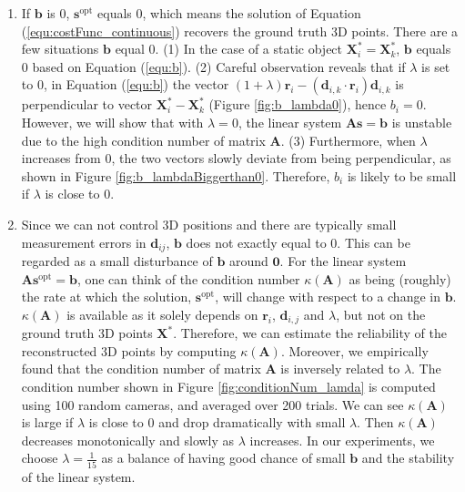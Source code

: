 \begin{enumerate}
\item If $\mathbf{b}$ is 0, $\mathbf{s}^\text{opt}$ equals 0, which means the solution of Equation (\ref{equ:costFunc_continuous}) recovers the ground truth 3D points. There are a few situations  $\mathbf{b}$ equal 0. (1) In the case of a static object $\mathbf{X}_i^* = \mathbf{X}_k^*$, $\mathbf{b}$ equals 0 based on Equation (\ref{equ:b}). (2) Careful observation reveals that if $\lambda$ is set to $0$, in Equation (\ref{equ:b}) the vector $(1+\lambda)\mathbf{r}_i - (\mathbf{d}_{i,k}\cdot \mathbf{r}_i)\mathbf{d}_{i,k}$ is perpendicular to vector $\mathbf{X}_i^*-\mathbf{X}_k^*$ (Figure \ref{fig:b_lambda0}), hence $b_i=0$. However, we will show that with $\lambda=0$, the linear system $\mathbf{A}\mathbf{s}= \mathbf{b}$ is unstable due to the high condition number of matrix $\mathbf{A}$. (3) Furthermore, when $\lambda$ increases from 0, the two vectors slowly deviate from being perpendicular, as shown in Figure \ref{fig:b_lambdaBiggerthan0}. Therefore, $b_i$ is likely to be small if $\lambda$ is close to 0.
\item Since we can not control 3D positions and there are typically small measurement errors in $\mathbf{d}_{ij}$, $\mathbf{b}$ does not exactly equal to 0. This can be regarded as a small disturbance of $\mathbf{b}$ around $\mathbf{0}$. For the linear system $\mathbf{A}\mathbf{s}^\text{opt}= \mathbf{b}$, one can think of the condition number $\kappa(\mathbf A)$ as being (roughly) the rate at which the solution, $\mathbf{s}^{\text{opt}}$, will change with respect to a change in $\mathbf{b}$. $\kappa(\mathbf A)$ is available as it solely depends on $\mathbf{r}_i$, $\mathbf{d}_{i,j}$ and $\lambda$, but not on the ground truth 3D points $\mathbf{X}^*$. Therefore, we can estimate the reliability of the reconstructed 3D points by computing $\kappa(\mathbf A)$. Moreover, we empirically found that the condition number of matrix $\mathbf{A}$ is inversely related to $\lambda$. The condition number shown in Figure \ref{fig:conditionNum_lamda} is computed using 100 random cameras, and averaged over 200 trials. We can see $\kappa(\mathbf A)$ is large if $\lambda$ is close to 0 and drop dramatically with small $\lambda$. Then $\kappa(\mathbf A)$ decreases monotonically and slowly as $\lambda$ increases. In our experiments, we choose $\lambda=\frac{1}{15}$ as a balance of having good chance of small $\mathbf{b}$ and the stability of the linear system.
\end{enumerate}

